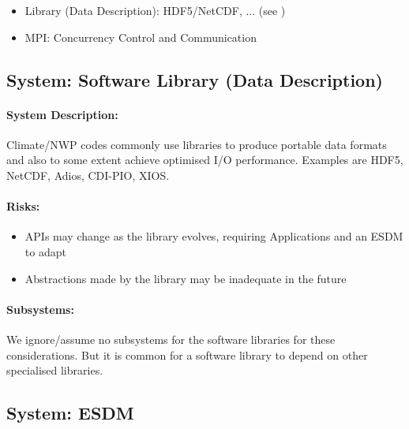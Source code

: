 \begin{itemize}
	\item Library (Data Description): HDF5/NetCDF, ...  (see )
	\item MPI: Concurrency Control and Communication %
\end{itemize}

\subsection{System: Software Library (Data Description)}
\label{System: Library}


\paragraph{System Description:}
Climate/NWP codes commonly use libraries to produce portable data formats and also to some extent achieve optimised I/O performance.
Examples are HDF5, NetCDF, Adios, CDI-PIO, XIOS.


\paragraph{Risks:}
\begin{itemize}
	\item APIs may change as the library evolves, requiring Applications and an ESDM to adapt
	\item Abstractions made by the library may be inadequate in the future
\end{itemize}


\paragraph{Subsystems:}
We ignore/assume no subsystems for the software libraries for these considerations.
But it is common for a software library to depend on other specialised libraries.




\subsection{System: ESDM}
\label{System: ESDM}

